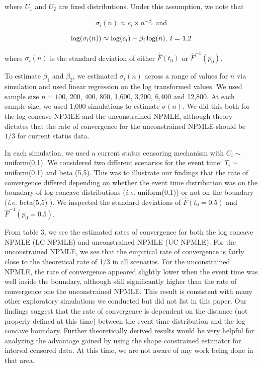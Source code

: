 	where $U_1$ and $U_2$ are fixed distributions. Under this assumption, we note that 
	
	\[ \sigma_i (n) \approx c_i \times n^{-\beta_i} \text{ and}	\]
		
	\[ \log( \sigma_i (n) ) \approx \log(c_i) - \beta_i \log(n) \text{, \emph{i} = 1,2} \]	
		
	where $\sigma_i(n)$ is the standard deviation of either $\hat F(t_0)$ or $\hat F^{-1}(p_0)$. 	
	
	To estimate $\beta_1$ and $\beta_2$, we estimated $\sigma_i(n)$ across a range of values for $n$ via simulation and used linear regression on the log transformed values. We used sample size $n = 100$, 200, 400, 800, 1,600, 3,200, 6,400 and 12,800. At each sample size, we used 1,000 simulations to estimate $\sigma(n)$.  We did this both for the log concave NPMLE and the unconstrained NPMLE, although theory dictates that the rate of convergence for the unconstrained NPMLE should be $1/3$ for current status data.  
	
	In each simulation, we used a current status censoring mechanism with $C_i \sim $ uniform(0,1). We considered two different scenarios for the event time: $T_i \sim $ uniform(0,1) and beta (5,5). This was to illustrate our findings that the rate of convergence differed depending on whether the event time distribution was on the boundary of log-concave distributions (\emph{i.e.} uniform(0,1)) or not on the boundary (\emph{i.e.} beta(5,5) ). We inspected the standard deviations of $\hat F(t_0 = 0.5)$ and $\hat F^{-1}( p_0 = 0.5)$.
		
	From table 3, we see the estimated rates of convergence for both the log concave NPMLE (LC NPMLE) and unconstrained NPMLE (UC NPMLE). For the unconstrained NPMLE, we see that the empirical rate of convergence is fairly close to the theoretical rate of 1/3 in all scenarios. For the unconstrained NPMLE, the rate of convergence appeared slightly lower when the event time was well inside the boundary, although still significantly higher than the rate of convergence one the unconstrained NPMLE. This result is consistent with many other exploratory simulations we conducted but did not list in this paper. Our findings suggest that the rate of convergence is dependent on the distance (not properly defined at this time) between the event time distribution and the log concave boundary. Further theoretically derived results would be very helpful for analyzing the advantage gained by using the shape constrained estimator for interval censored data. At this time, we are not aware of any work being done in that area. 

